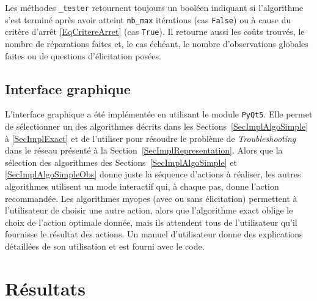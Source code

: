 \documentclass[a4paper,11pt]{article}
\theoremstyle{plain}
\theoremstyle{definition}
\DeclareMathOperator{\EC}{EC}
\DeclareMathOperator{\EVOI}{EVOI}
\begin{document}
Les méthodes \texttt{\_tester} retournent toujours un booléen indiquant si l'algorithme s'est terminé après avoir atteint \texttt{nb\_max} itérations (cas \texttt{False}) ou à cause du critère d'arrêt \eqref{EqCritereArret} (cas \texttt{True}). Il retourne aussi les coûts trouvés, le nombre de réparations faites et, le cas échéant, le nombre d'observations globales faites ou de questions d'élicitation posées.

\subsection{Interface graphique}
\label{SecImplInterface}

L'interface graphique a été implémentée en utilisant le module \texttt{PyQt5}. Elle permet de sélectionner un des algorithmes décrits dans les Sections~\ref{SecImplAlgoSimple} à \ref{SecImplExact} et de l'utiliser pour résoudre le problème de \emph{Troubleshooting} dans le réseau présenté à la Section~\ref{SecImplRepresentation}. Alors que la sélection des algorithmes des Sections~\ref{SecImplAlgoSimple} et \ref{SecImplAlgoSimpleObs} donne juste la séquence d'actions à réaliser, les autres algorithmes utilisent un mode interactif qui, à chaque pas, donne l'action recommandée. Les algorithmes myopes (avec ou sans élicitation) permettent à l'utilisateur de choisir une autre action, alors que l'algorithme exact oblige le choix de l'action optimale donnée, mais ils attendent tous de l'utilisateur qu'il fournisse le résultat des actions. Un manuel d'utilisateur donne des explications détaillées de son utilisation et est fourni avec le code.

\section{Résultats}
\label{SecResultats}

\end{document}

